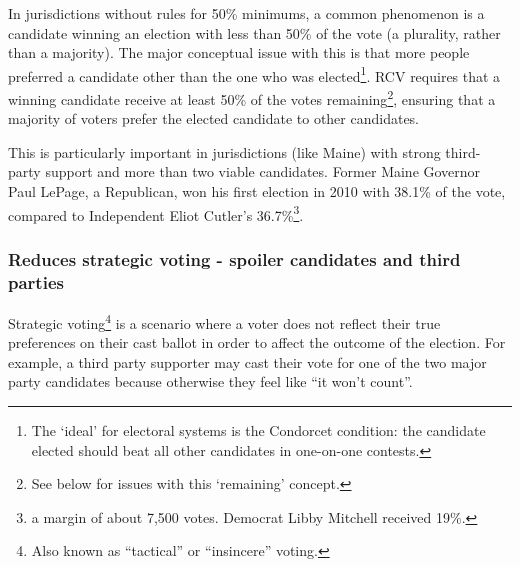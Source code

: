 \documentclass[12pt,twoside]{reedthesis}
\theoremstyle{definition}
\theoremstyle{definition}
\theoremstyle{definition}
\theoremstyle{remark}
\begin{document}
In jurisdictions without rules for 50\% minimums, a common phenomenon is
a candidate winning an election with less than 50\% of the vote (a
plurality, rather than a majority). The major conceptual issue with this
is that more people preferred a candidate other than the one who was
elected\footnote{The `ideal' for electoral systems is the Condorcet
  condition: the candidate elected should beat all other candidates in
  one-on-one contests.}. RCV requires that a winning candidate receive
at least 50\% of the votes remaining\footnote{See below for issues with
  this `remaining' concept.}, ensuring that a majority of voters prefer
the elected candidate to other candidates.

This is particularly important in jurisdictions (like Maine) with strong
third-party support and more than two viable candidates. Former Maine
Governor Paul LePage, a Republican, won his first election in 2010 with
38.1\% of the vote, compared to Independent Eliot Cutler's
36.7\%\footnote{a margin of about 7,500 votes. Democrat Libby Mitchell
  received 19\%.}.

\hypertarget{reduces-strategic-voting---spoiler-candidates-and-third-parties}{%
\subsubsection{Reduces strategic voting - spoiler candidates and third
parties}\label{reduces-strategic-voting---spoiler-candidates-and-third-parties}}

Strategic voting\footnote{Also known as ``tactical'' or ``insincere''
  voting.} is a scenario where a voter does not reflect their true
preferences on their cast ballot in order to affect the outcome of the
election. For example, a third party supporter may cast their vote for
one of the two major party candidates because otherwise they feel like
``it won't count''.
\end{document}
